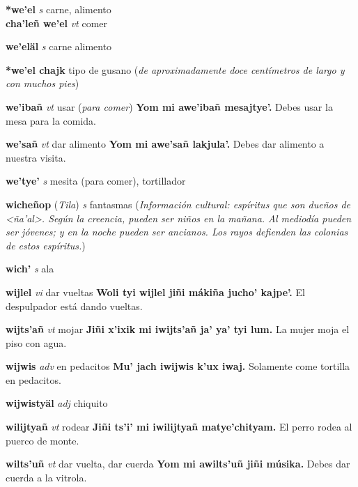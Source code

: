 \documentclass[10pt]{scrbook}
\newcommand{\entry}[1]{\textbf{#1}}
\newcommand{\partofspeech}[1]{\textit{#1}}
\newcommand{\spanishtranslation}[1]{#1}
\newcommand{\clarification}[1]{(\textit{#1})}
\newcommand{\cholexample}[1]{\textbf{#1}}
\newcommand{\exampletranslation}[1]{#1}
\newcommand{\relevantdialect}[1]{(\textit{#1})}
\newcommand{\culturalinformation}[1]{(\textit{#1})}
\newcommand{\secondaryentry}[1]{\\\textbf{#1}}
\newcommand{\secondpartofspeech}[1]{\textit{#1}}
\newcommand{\secondtranslation}[1]{#1}
\begin{document}
\begin{multicols}{2}
\entry{*we'el}
\partofspeech{s}
\spanishtranslation{carne, alimento}
\secondaryentry{cha'leñ we'el}
\secondpartofspeech{vt}
\secondtranslation{comer}

\entry{we'eläl}
\partofspeech{s}
\spanishtranslation{carne}
\spanishtranslation{alimento}

\entry{*we'el chajk}
\spanishtranslation{tipo de gusano}
\clarification{de aproximadamente doce centímetros de largo y con muchos pies}

\entry{we'ibañ}
\partofspeech{vt}
\spanishtranslation{usar}
\clarification{para comer}
\cholexample{Yom mi awe'ibañ mesajtye'.}
\exampletranslation{Debes usar la mesa para la comida.}

\entry{we'sañ}
\partofspeech{vt}
\spanishtranslation{dar alimento}
\cholexample{Yom mi awe'sañ lakjula'.}
\exampletranslation{Debes dar alimento a nuestra visita.}

\entry{we'tye'}
\partofspeech{s}
\spanishtranslation{mesita (para comer), tortillador}

\entry{wicheñop}
\relevantdialect{Tila}
\partofspeech{s}
\spanishtranslation{fantasmas}
\culturalinformation{Información cultural: espíritus que son dueños de <ña'al>. Según la creencia, pueden ser niños en la mañana. Al mediodía pueden ser jóvenes; y en la noche pueden ser ancianos. Los rayos defienden las colonias de estos espíritus.}

\entry{wich'}
\partofspeech{s}
\spanishtranslation{ala}

\entry{wijlel}
\partofspeech{vi}
\spanishtranslation{dar vueltas}
\cholexample{Woli tyi wijlel jiñi mákiña jucho' kajpe'.}
\exampletranslation{El despulpador está dando vueltas.}

\entry{wijts'añ}
\partofspeech{vt}
\spanishtranslation{mojar}
\cholexample{Jiñi x'ixik mi iwijts'añ ja' ya' tyi lum.}
\exampletranslation{La mujer moja el piso con agua.}

\entry{wijwis}
\partofspeech{adv}
\spanishtranslation{en pedacitos}
\cholexample{Mu' jach iwijwis k'ux iwaj.}
\exampletranslation{Solamente come tortilla en pedacitos.}

\entry{wijwistyäl}
\partofspeech{adj}
\spanishtranslation{chiquito}

\entry{wilijtyañ}
\partofspeech{vt}
\spanishtranslation{rodear}
\cholexample{Jiñi ts'i' mi iwilijtyañ matye'chityam.}
\exampletranslation{El perro rodea al puerco de monte.}

\entry{wilts'uñ}
\partofspeech{vt}
\spanishtranslation{dar vuelta, dar cuerda}
\cholexample{Yom mi awilts'uñ jiñi músika.}
\exampletranslation{Debes dar cuerda a la vitrola.}


\end{multicols}
\end{document}
